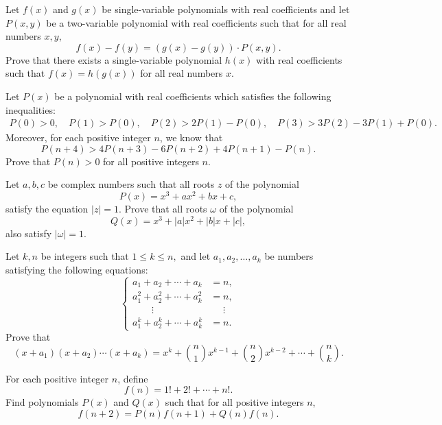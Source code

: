 \begin{question}
    Let $f(x)$ and $g(x)$ be single-variable polynomials with real coefficients and let $P(x,y)$ be a two-variable polynomial with real coefficients such that for all real numbers $x,y$, \[f(x)-f(y)=(g(x)-g(y)) \cdot P(x,y).\] Prove that there exists a single-variable polynomial $h(x)$ with real coefficients such that $f(x)=h(g(x))$ for all real numbers $x$.
\end{question}


\begin{question}
    Let $P(x)$ be a polynomial with real coefficients which satisfies the following inequalities:
    \begin{align*}
        P(0) >0, \quad P(1)>P(0), \quad P(2) > 2P(1) - P(0), \quad P(3) > 3P(2) - 3P(1) + P(0).
    \end{align*}
    Moreover, for each positive integer $n$, we know that
    \[P(n+4) > 4P(n+3) - 6P(n+2) + 4P(n+1) - P(n).\]
    Prove that $P(n)>0$ for all positive integers $n$.
\end{question}


\begin{question}[name={1995 Ireland}]
    Let $a,b,c$ be complex numbers such that all roots $z$ of the polynomial
    \[P(x)=x^3+ax^2+bx+c,\] satisfy the equation $|z|=1$. Prove that all roots $\omega$ of the polynomial \[Q(x)=x^3 + |a|x^2 + |b|x + |c|,\] also satisfy $|\omega|=1$.
\end{question}


\begin{question}[name={1995 Japan}]
    Let $k,n$ be integers such that $1\leq k\leq n,$ and let $a_1, a_2, \dots, a_k$ be numbers satisfying the following equations:
    \[ \begin{cases} a_1+a_2+\cdots+a_k &= n, \\ a_1^2+a_2^2 +\cdots +a_k^2 &= n,\\ \qquad \vdots &\phantom{=} \vdots \\ a_1^k+a_2^k+\cdots+a_k^k &= n. \end{cases} \]
    Prove that \[(x+a_1)(x+a_2)\cdots(x+a_k) = x^k+\binom{n}{1} x^{k-1} + \binom{n}{2} x^{k-2}+\cdots+ \binom{n}{k}.\]
\end{question}


\begin{question}
    For each positive integer $n$, define \[f(n) = 1! + 2! + \cdots + n!.\] Find polynomials $P(x)$ and $Q(x)$ such that for all positive integers $n$,
    \[f(n+2) = P(n)f(n+1) + Q(n) f(n).\]
\end{question}


